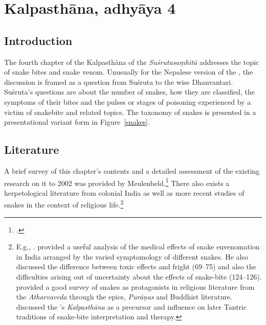 \section{Kalpasthāna, adhyāya 4}

\subsection{Introduction}
The fourth chapter of the Kalpasthāna of the \emph{Suśrutasaṃhitā} addresses 
the topic of snake bites and snake venom.  Unusually for the Nepalese version of 
the \SS, the discussion is framed as a question from Suśruta to the wise 
Dhanvantari.  Suśruta's questions are about the number of snakes, how they 
are classified, the symptoms of their bites and the pulses or stages of poisoning 
experienced by a victim of snakebite and related topics.  The taxonomy of snakes 
is presented in a presentational variant form in Figure~\ref{snakes}.


    
\subsection{Literature} A brief survey of this chapter's contents and a
detailed assessment of the existing research on it to 2002 was provided by
Meulenbeld.\footcite[IA, 292--294]{meul-hist} There also exists a
herpetological literature from colonial India as well as more recent studies
of snakes in the context of religious life.\footnote{E.g., \cite{ewar-1878,
    wall-1921}.  \citet[75--124]{wall-1913} provided a useful analysis of the
    medical effects of snake envenomation in India arranged by the varied
    symptomology of different snakes.  He also discussed the difference between
    toxic effects and fright (69--75) and also the difficulties arising out of
    uncertainty about the effects of snake-bite (124--126).  \citet{doni-2015}
    provided a good survey of snakes as protagonists in religious literature
    from the \emph{Atharvaveda} through the epics, \emph{Purāṇas} and Buddhist
    literature. \citet[31--33 \emph{et passim}]{slou-2016} discussed the \SS's
    \emph{Kalpasthāna} as a precursor and influence on later Tantric traditions
    of snake-bite interpretation and therapy. } %
    
